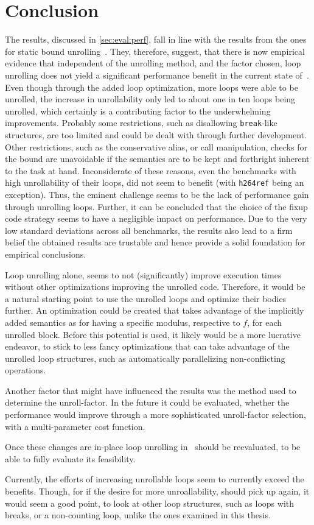\chapter{Conclusion}\label{sec:conclusion}

The results, discussed in \cref{sec:eval:perf}, fall in line with the results from the ones for static bound unrolling~\cite{aebi18bachelorarbeit}.
They, therefore, suggest, that there is now empirical evidence that independent of the unrolling method, and the factor chosen, loop unrolling does not yield a significant performance benefit in the current state of~\libFIRM.
Even though through the added loop optimization, more loops were able to be unrolled, the increase in unrollability only led to about one in ten loops being unrolled, which certainly is a contributing factor to the underwhelming improvements.
Probably some restrictions, such as disallowing \texttt{break}-like structures, are too limited and could be dealt with through further development.
Other restrictions, such as the conservative alias, or call manipulation, checks for the bound are unavoidable if the semantics are to be kept and forthright inherent to the task at hand.
Inconsiderate of these reasons, even the benchmarks with high unrollability of their loops, did not seem to benefit (with \texttt{h264ref} being an exception).
Thus, the eminent challenge seems to be the lack of performance gain through unrolling loops.
Further, it can be concluded that the choice of the fixup code strategy seems to have a negligible impact on performance.
Due to the very low standard deviations across all benchmarks, the results also lead to a firm belief the obtained results are trustable and hence provide a solid foundation for empirical conclusions.

Loop unrolling alone, seems to not (significantly) improve execution times without other optimizations improving the unrolled code.
Therefore, it would be a natural starting point to use the unrolled loops and optimize their bodies further.
An optimization could be created that takes advantage of the implicitly added semantics as for having a specific modulus, respective to $f$, for each unrolled block.
Before this potential is used, it likely would be a more lucrative endeavor, to stick to less fancy optimizations that can take advantage of the unrolled loop structures, such as automatically parallelizing non-conflicting operations.

Another factor that might have influenced the results was the method used to determine the unroll-factor.
In the future it could be evaluated, whether the performance would improve through a more sophisticated unroll-factor selection, with a multi-parameter cost function.

Once these changes are in-place loop unrolling in~\libFIRM{} should be reevaluated, to be able to fully evaluate its feasibility.

Currently, the efforts of increasing unrollable loops seem to currently exceed the benefits.
Though, for if the desire for more unroallability, should pick up again, it would seem a good point, to look at other loop structures, such as loops with breaks, or a non-counting loop, unlike the ones examined in this thesis.
